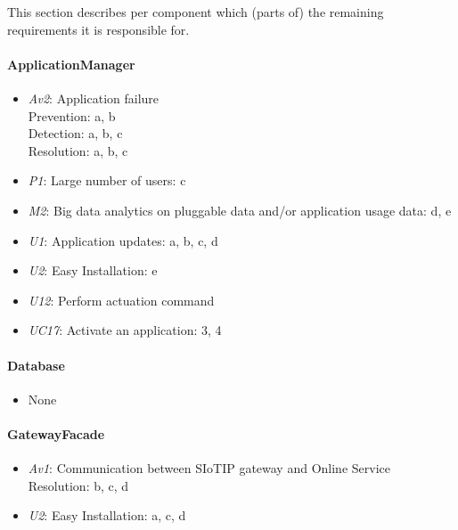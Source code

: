     \noindent This section describes per component which (parts of) the remaining
    requirements it is responsible for.

    \paragraph{ApplicationManager}
        \begin{itemize}
            \item  \emph{Av2}: Application failure \\
                   Prevention: a, b \\
                   Detection: a, b, c \\
                   Resolution: a, b, c
           \item \emph{P1}: Large number of users: c
           \item \emph{M2}: Big data analytics on pluggable data and/or application usage data: d, e
           \item \emph{U1}: Application updates: a, b, c, d
           \item \emph{U2}: Easy Installation: e
           \item \emph{U12}: Perform actuation command
           \item \emph{UC17}: Activate an application: 3, 4
        \end{itemize}

    \paragraph{Database}
        \begin{itemize}
          	\item None
        \end{itemize}

    \paragraph{GatewayFacade}
        \begin{itemize}
            \item \emph{Av1}: Communication between SIoTIP gateway and Online Service \\
                               Resolution: b, c, d
            \item \emph{U2}: Easy Installation: a, c, d
        \end{itemize}

